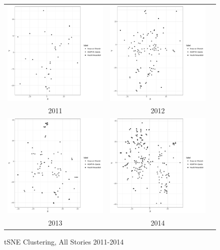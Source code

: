\begin{figure}
  \begin{center}
  \begin{tabular}{ccc}
 \includegraphics[width=.45\columnwidth]{./Pictures/2011DV_Panel_P50_tSNEDimRed.pdf}&
\includegraphics[width=.45\columnwidth]{./Pictures/2012DV_Panel_P50_tSNEDimRed.pdf}\\
 2011 & 2012\\
 \includegraphics[width=.45\columnwidth]{./Pictures/2013DV_Panel_P50_tSNEDimRed.pdf}&
 \includegraphics[width=.45\columnwidth]{./Pictures/2014DV_Panel_P50_tSNEDimRed.pdf}\\
  2013 & 2014\\
  \end{tabular}
  \caption{tSNE Clustering, All Stories 2011-2014}
  \label{fig:tSNE}
  \end{center}
  \end{figure}

